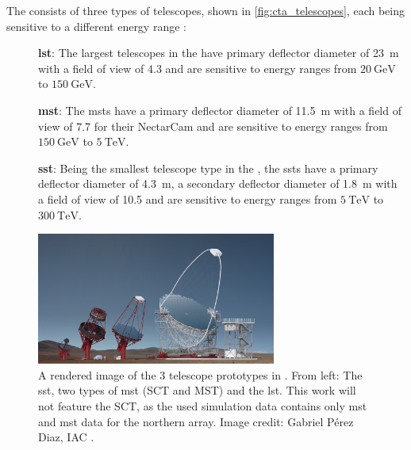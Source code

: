 The \cta{} consists of three types of telescopes, shown in \autoref{fig:cta_telescopes}, each being
sensitive to a different energy range \cite{cta_specs}:
\begin{description}
    \item [] \textbf{\gls{lst}}: The largest telescopes in the \cta{} have primary deflector diameter
    of \SI{23}{\meter} with a field of view of \SI{4.3}{\deg} and are sensitive to energy
    ranges from \(\SI{20}{\giga\eV}\) to \(\SI{150}{\giga\eV}\).
    \item [] \textbf{\gls{mst}}: The \glspl{mst} have a primary deflector diameter of \SI{11.5}{\meter}
    with a field of view of \SI{7.7}{\deg} for their NectarCam and are sensitive to energy ranges
    from \(\SI{150}{\giga\eV}\) to \(\SI{5}{\tera\eV}\).
    \item [] \textbf{\gls{sst}}: Being the smallest telescope type in the \cta{}, the \glspl{sst}
    have a primary deflector diameter of \SI{4.3}{\meter}, a secondary deflector diameter of
    \SI{1.8}{\meter} with a field of view of \SI{10.5}{\deg} and are sensitive to energy ranges
    from \(\SI{5}{\tera\eV}\) to \(\SI{300}{\tera\eV}\).
\end{description}

\begin{figure}
    \centering
    \includegraphics[width=0.7\textwidth]{graphics/telescopes_render.jpg}
    \caption{A rendered image of the 3 telescope prototypes in \cta{}. From left: The \gls{sst},
    two types of \gls{mst} (SCT and MST) and the \gls{lst}. This work will not feature the SCT, as
    the used simulation data contains only \gls{mst} and \gls{mst} data for the northern array.
    Image credit: Gabriel Pérez Diaz, IAC \cite{cta_tech}.}
    \label{fig:cta_telescopes}
\end{figure}

